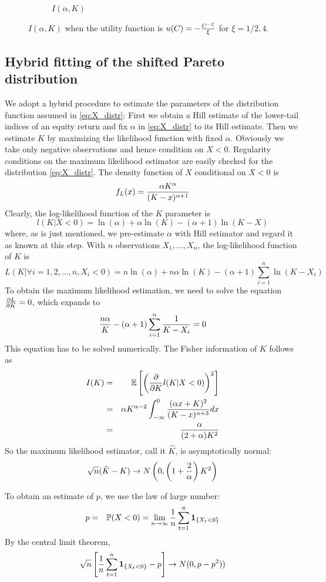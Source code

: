 \documentclass{article}
\begin{document}
\begin{figure}[htb!]
\begin{subfigure}[b]{0.5\linewidth}
    \caption{$I(\alpha, K)$}
    \label{fig:preference_pareto4}
  \end{subfigure}
  \caption{$I(\alpha, K)$ when the utility function is
    $u(C) = -{C^{-\xi} \over \xi}$ for $\xi = 1/2, 4$.
  }
\end{figure}

\subsection{Hybrid fitting of the shifted Pareto distribution}
\label{sec:hybrid_estimation}
We adopt a hybrid procedure to estimate the parameters of the
distribution function assumed in \eqref{eq:X_distr}: First we
obtain a Hill estimate of the lower-tail indices of an
equity return and fix $\alpha$ in \eqref{eq:X_distr}
to its Hill estimate. Then we estimate $K$ by maximizing
the likelihood function with fixed $\alpha$. Obviously we take only
negative observations and hence condition on $X < 0$. Regularity
conditions on the maximum likelihood estimator are easily checked for
the distribution \eqref{eq:X_distr}.
The density function of $X$ conditional on $X < 0$ is
\[
f_L(x) = {\alpha K^{\alpha} \over (K - x)^{\alpha + 1}}
\]
Clearly, the log-likelihood function of the $K$ parameter is
\[
l(K | X < 0) = \ln(\alpha) + \alpha \ln(K) - (\alpha + 1)\ln(K - X)
\]
where, as is just mentioned, we pre-estimate $\alpha$ with Hill
estimator and regard it as known at this step. With $n$ observations
$X_1, \dots, X_n$, the log-likelihood function of $K$ is
\[
L(K | \forall i=1,2,...,n, X_i < 0) = n \ln(\alpha) + n \alpha \ln(K)
- (\alpha + 1) \sum_{i=1}^n \ln(K - X_i)
\]
To obtain the maximum likelihood estimation, we need to solve the
equation $\frac{\partial L}{\partial K} = 0$, which expands to
\[
{n \alpha \over K} - (\alpha + 1) \sum_{i=1}^n {1 \over K - X_i} = 0
\]
This equation has to be solved numerically.
The Fisher information of $K$ follows as
\begin{eqnarray*}
  I(K) &=& \mathbb{E}\left[ \left( \frac{\partial}{\partial K} l(K | X < 0) \right)^2 \right] \\
  &=& \alpha K^{\alpha - 2}
  \int_{-\infty}^0 {(\alpha x + K)^2 \over (K - x)^{\alpha + 3}} dx \\
  &=& {\alpha \over (2 + \alpha) K^2}
\end{eqnarray*}
So the maximum likelihood estimator, call it $\hat K$, is
asymptotically normal:
\[
\sqrt n (\hat K - K) \to N \left(
  0, \left( 1 + {2 \over \alpha} \right) K^2
\right)
\]

To obtain an estimate of $p$, we use the law of large number:
\begin{eqnarray*}
  p &=& \mathbb{P}(X < 0) = \lim_{n \to \infty}
  {1 \over n} \sum_{t=1}^n \mathbf{1}_{\{X_t < 0\}}
\end{eqnarray*}
By the central limit theorem,
\begin{eqnarray*}
  \sqrt n \left[
    {1 \over n}\sum_{t=1}^n \mathbf{1}_{\{X_t < 0\}} - p
  \right] \to N(0, p - p^2))
\end{eqnarray*}
\end{document}
